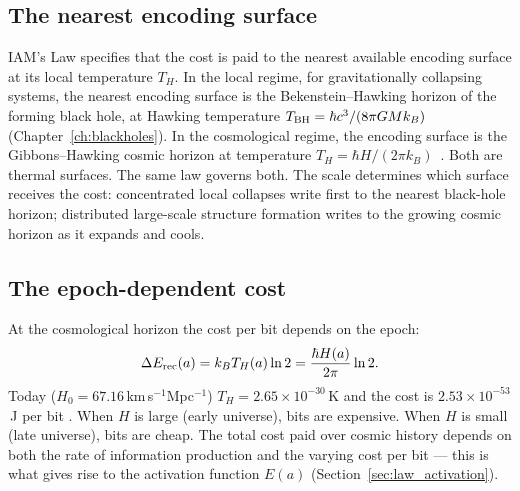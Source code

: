 \subsection{The nearest encoding surface}
IAM's Law specifies that the cost is paid to the nearest available encoding surface at its local temperature $T_H$. In the local regime, for
gravitationally collapsing systems, the nearest encoding surface is the Bekenstein--Hawking horizon of the forming black hole, at Hawking temperature
$T_{\rm BH}=\hbar c^3/(8\pi GMk_B)$ (Chapter~\ref{ch:blackholes}). In the cosmological regime, the encoding surface is the Gibbons--Hawking cosmic horizon at
temperature $T_H=\hbar H/(2\pi k_B)$~\cite{GibbonsHawking1977}. Both are thermal surfaces. The same law governs both. The scale determines which surface
receives the cost: concentrated local collapses write first to the nearest black-hole horizon; distributed large-scale structure formation writes to the
growing cosmic horizon as it expands and cools.

\subsection{The epoch-dependent cost}
At the cosmological horizon the cost per bit depends on the epoch:
\begin{equation}
\Delta E_{\rm rec}(a)=k_BT_H(a)\ln2=\frac{\hbar H(a)}{2\pi}\ln2 . \label{eq:epochcost}
\end{equation}
Today ($H_0=67.16$\,km\,s$^{-1}$Mpc$^{-1}$) $T_H=2.65\times10^{-30}$\,K and the cost is $2.53\times10^{-53}$\,J per bit \calc. When $H$ is large (early
universe), bits are expensive. When $H$ is small (late universe), bits are cheap. The total cost paid over cosmic history depends on both the rate of
information production and the varying cost per bit --- this is what gives rise to the activation function $E(a)$ (Section~\ref{sec:law_activation}).

